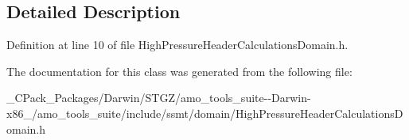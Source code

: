 \subsection{Detailed Description}


Definition at line 10 of file High\+Pressure\+Header\+Calculations\+Domain.\+h.



The documentation for this class was generated from the following file\+:\begin{DoxyCompactItemize}
\item 
\+\_\+\+C\+Pack\+\_\+\+Packages/\+Darwin/\+S\+T\+G\+Z/amo\+\_\+tools\+\_\+suite-\/-\/\+Darwin-\/x86\+\_/amo\+\_\+tools\+\_\+suite/include/ssmt/domain/High\+Pressure\+Header\+Calculations\+Domain.\+h\end{DoxyCompactItemize}
